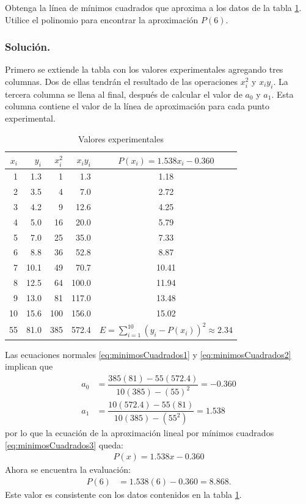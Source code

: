 \begin{example}{\rm Obtenga la línea de mínimos cuadrados que aproxima a los datos de la tabla \ref{table:ejemplo1MinimosCuadradosLineales}.
	Utilice el polinomio para encontrar la aproximación $P(6)$.
	\subsubsection*{Solución.} 
	Primero se extiende la tabla con los valores experimentales agregando tres columnas. Dos de ellas tendrán
	el resultado de las operaciones $x_i^2$ y $x_iy_i$. La tercera columna se llena al final, después de calcular el valor de $a_0$
	y $a_1$. Esta columna contiene el valor de la línea de aproximación para cada punto experimental.
	\begin{table}[H]
    	\centering
      \begin{tabular}{|r|r|r|r|c|}
		\hline
		\rowcolor[gray]{0.9} $x_i$ & $y_i$ & $x_i^2$ & $x_iy_i$ & $P(x_i) = 1.538x_i - 0.360$\\\hline
			1 & 1.3 & 1 & 1.3 & 1.18\\
			2 & 3.5 & 4 & 7.0 & 2.72\\
			3 & 4.2 & 9 & 12.6 & 4.25\\
			4 & 5.0 & 16 & 20.0 & 5.79\\
			5 & 7.0 & 25 & 35.0 & 7.33\\
			6 & 8.8 & 36 & 52.8 & 8.87\\
			7 & 10.1 & 49 & 70.7 & 10.41\\
			8 & 12.5 & 64 & 100.0 & 11.94\\
			9 & 13.0 & 81 & 117.0 & 13.48\\
			10 & 15.6 & 100 & 156.0 & 15.02\\\hline
			55 & 81.0 & 385 & 572.4 & $E=\sum_{i=1}^{10} (y_i-P(x_i))^2 \approx 2.34$\\
		\hline
      \end{tabular}
      \label{table:ejemplo1MinimosCuadradosLineales}
      \caption{Valores experimentales}
  \end{table} 	
	
	Las ecuaciones normales \ref{eq:minimosCuadrados1} y \ref{eq:minimosCuadrados2} implican que
	\begin{align*}
		a_0 &= \dfrac{385(81) - 55(572.4)}{10(385) - (55)^2} = -0.360 \\
		a_1 &= \dfrac{10(572.4) - 55(81)}{10(385) - (55^2)} = 1.538
	\end{align*}
	por lo que la ecuación de la aproximación lineal por mínimos cuadrados \ref{eq:minimosCuadrados3} queda:
	\begin{align*}
		P(x)= 1.538x - 0.360
	\end{align*}
	Ahora se encuentra la evaluación:
	\begin{align*}
		P(6) &= 1.538(6) - 0.360 = 8.868.
	\end{align*}
	Este valor es consistente con los datos contenidos en la tabla \ref{table:ejemplo1MinimosCuadradosLineales}.
}\end{example}

